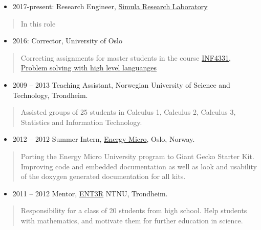 \documentclass[11pt, a4paper]{article}
\providecommand{\tightlist}{%
  \setlength{\itemsep}{0pt}\setlength{\parskip}{0pt}}
\begin{document}
\begin{raggedright}
\begin{itemize}
\tightlist
\item
  2017-present: Research Engineer, \href{https://www.simula.no}{Simula
  Research Laboratory}
\end{itemize}

\begin{quote}
In this role
\end{quote}

\begin{itemize}
\tightlist
\item
  2016: Corrector, University of Oslo
\end{itemize}

\begin{quote}
Correcting assignments for master students in the course
\href{https://www.uio.no/studier/emner/matnat/ifi/INF4331/index-eng.html}{INF4331,
Problem solving with high level languanges}
\end{quote}

\begin{itemize}
\tightlist
\item
  2009 -- 2013 Teaching Assistant, Norwegian University of Science and
  Technology, Trondheim.
\end{itemize}

\begin{quote}
Assisted groups of 25 students in Calculus 1, Calculus 2, Calculus 3,
Statistics and Information Technology.
\end{quote}

\begin{itemize}
\tightlist
\item
  2012 -- 2012 Summer Intern, \href{https://www.silabs.com}{Energy
  Micro}, Oslo, Norway.
\end{itemize}

\begin{quote}
Porting the Energy Micro University program to Giant Gecko Starter Kit.
Improving code and embedded documentation as well as look and usability
of the doxygen generated documentation for all kits.
\end{quote}

\begin{itemize}
\tightlist
\item
  2011 -- 2012 Mentor, \href{https://www.ent3r.no}{ENT3R} NTNU,
  Trondheim.
\end{itemize}

\begin{quote}
Responsibility for a class of 20 students from high school. Help
students with mathematics, and motivate them for further education in
science.
\end{quote}


\end{raggedright}
\end{document}

